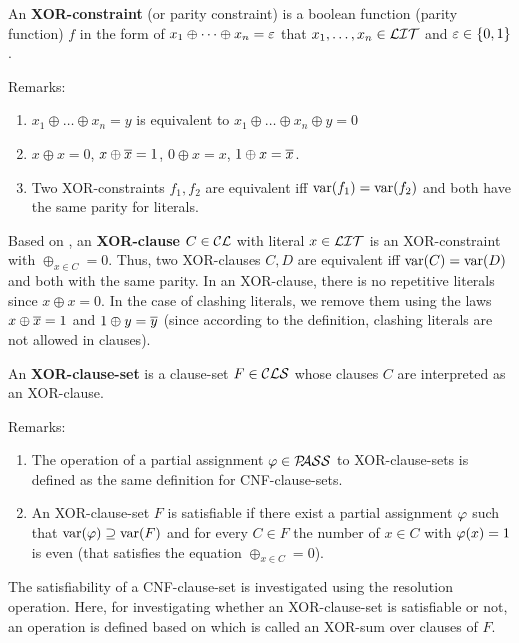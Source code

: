 \documentclass{report}
\begin{document}
\begin{defi}\label{def:xor-const} 
An \textbf{XOR-constraint} (or parity constraint) is a boolean function (parity function) $f$ in the form of $x_1 \oplus \dots \oplus x_n = \varepsilon$ that $x_1, \dots, x_n \in \mathcal{LIT}$ and $\varepsilon \in \{ 0,1 \}$.
\end{defi}

Remarks:
\begin{enumerate}
    \item $x_1 \oplus \dots \oplus x_n = y$ is equivalent to $x_1 \oplus \dots \oplus x_n \oplus y = 0$
    \item $x \oplus x = 0$, $x \oplus \overline{x} = 1$, $0 \oplus x = x$, $1 \oplus x = \overline{x}$.
    \item Two XOR-constraints $f_1, f_2$ are equivalent iff $\operatorname{var}(f_1) = \operatorname{var}(f_2)$ and both have the same parity for literals.
\end{enumerate}

\begin{defi}\label{def:xor-cls}
Based on \cite{GwynneKullmann2013GoodRepresentationsIIex}, an \textbf{XOR-clause} $C \in \mathcal{CL}$ with literal $x \in \mathcal{LIT}$ is an XOR-constraint with $\oplus_{x \in C} = 0$. Thus, two XOR-clauses $C, D$ are equivalent iff $\operatorname{var}(C) = \operatorname{var}(D)$ and both with the same parity. In an XOR-clause, there is no repetitive literals since $x \oplus x = 0$. In the case of clashing literals, we remove them using the laws $x \oplus \overline{x} = 1$ and $1 \oplus y = \overline{y}$ (since according to the definition, clashing literals are not allowed in clauses).

An \textbf{XOR-clause-set} is a clause-set $F \in \mathcal{CLS}$ whose clauses $C$ are interpreted as an XOR-clause.  
\end{defi} 

Remarks:
\begin{enumerate}
  \item The operation of a partial assignment $\varphi \in \mathcal{P\hspace{-0.32em}ASS}$ to XOR-clause-sets is defined as the same definition for CNF-clause-sets.
  \item An XOR-clause-set $F$ is satisfiable if there exist a partial assignment $\varphi$ such that $\operatorname{var}(\varphi) \supseteq \operatorname{var}(F)$ and for every $C \in F$ the number of $x \in C$ with $\varphi(x) = 1$ is even (that satisfies the equation  $\oplus_{x \in C} = 0$).
\end{enumerate}

The satisfiability of a CNF-clause-set is investigated using the resolution operation. Here, for investigating whether an XOR-clause-set is satisfiable or not, an operation is defined based on \cite{GwynneKullmann2013GoodRepresentationsIIex,GwynneKullmann2013GoodRepresentationsIILata} which is called an XOR-sum over clauses of $F$.
\end{document}
